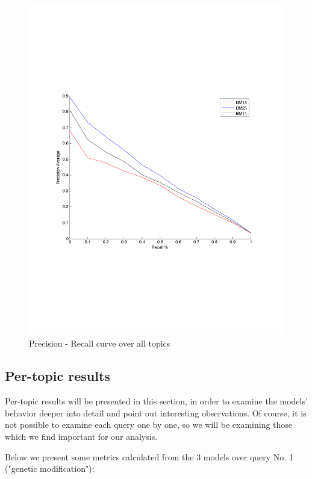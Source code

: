 \documentclass[letterpaper,11pt]{article}
\begin{document}
\begin{figure}[ht]
\centering
\includegraphics[scale = 0.75]{pr.pdf}
\caption{Precision - Recall curve over all topics}

\end{figure}



\subsection{Per-topic results}

Per-topic results will be presented in this section, in order to examine the models' behavior deeper into detail and point out interesting observations. Of course, it is not possible to examine each query one by one, so we will be examining those which we find important for our analysis.

Below we present some metrics calculated from the 3 models over query No. 1 ("genetic modification"): 
\end{document}

